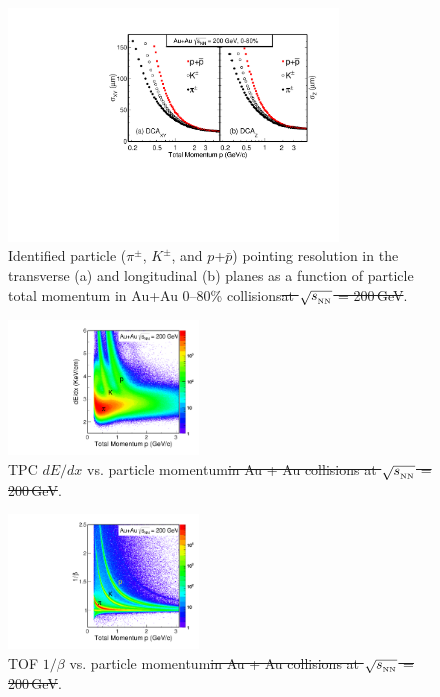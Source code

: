 \documentclass[%
 reprint,	
 amsmath,amssymb,
 aps,
 prc,
]{revtex4-1}
\providecommand{\DIFdeltex}[1]{{\protect\color{red}\sout{#1}}}                      %
\providecommand{\DIFdelFL}[1]{\DIFdel{#1}} %
\providecommand{\DIFaddbeginFL}{} %
\providecommand{\DIFaddendFL}{} %
\providecommand{\DIFdelbeginFL}{} %
\providecommand{\DIFdelendFL}{} %
\providecommand{\DIFdel}[1]{\texorpdfstring{\DIFdeltex{#1}}{}} %
\begin{document}
\begin{figure}
\centering
\DIFdelbeginFL %
\DIFdelendFL \DIFaddbeginFL \includegraphics[width=0.78\textwidth]{fig/DCAXy_Z.pdf}
\DIFaddendFL \caption{Identified particle ($\pi^{\pm}$, $K^{\pm}$, and $p$+$\bar{p}$) pointing resolution in the transverse (a) and longitudinal (b) planes as a function of particle total momentum in Au+Au 0--80\% collisions\DIFdelbeginFL \DIFdelFL{at $\sqrt{s_{_{\rm NN}}}$ = 200\,GeV}\DIFdelendFL .}
\label{fig:DCAXy_Z} 
\end{figure}

\begin{figure}[h]
\centering
\includegraphics[width=0.45\textwidth]{fig/PID_dEdx.pdf}
\caption{TPC $dE/dx$ vs. particle momentum\DIFdelbeginFL \DIFdelFL{in Au + Au collisions at $\sqrt{s_{_{\rm NN}}}$ = 200\,GeV}\DIFdelendFL .}
\label{fig:PID_dEdx} 
\end{figure}

\begin{figure}[h]
\centering
\includegraphics[width=0.45\textwidth]{fig/PID_beta.pdf}
\caption{TOF $1/\beta$ vs. particle momentum\DIFdelbeginFL \DIFdelFL{in Au + Au collisions at $\sqrt{s_{_{\rm NN}}}$ = 200\,GeV}\DIFdelendFL .}
\label{fig:PID_beta} 
\end{figure}
\end{document}
